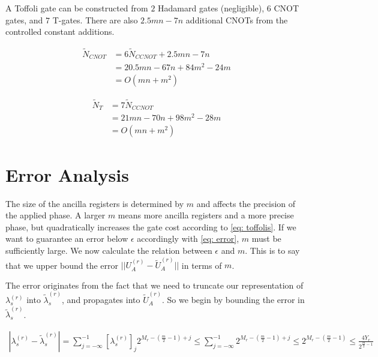 A Toffoli gate can be constructed from $2$ Hadamard gates (negligible), $6$ CNOT gates, and $7$ T-gates. There are also $2.5mn - 7n$ additional CNOTs from the controlled constant additions.

\begin{equation}
    \begin{split}
        \tilde{N}_{CNOT} &= 6\tilde{N}_{CCNOT} + 2.5mn - 7n \\
        &= 20.5mn - 67n + 84m^2 - 24m \\
        &= O(mn + m^2) \label{eq: cnots}
    \end{split}
\end{equation}

\begin{equation}
    \begin{split}
        \tilde{N}_{T} &= 7\tilde{N}_{CCNOT} \\
        &= 21mn - 70n + 98m^2 - 28m \\
        &= O(mn + m^2) \label{eq: Ts}
    \end{split}
\end{equation}

\section{Error Analysis}

The size of the ancilla registers is determined by $m$ and affects the precision of the applied phase. A larger $m$ means more ancilla registers and a more precise phase, but quadratically increases the gate cost according to \eqref{eq: toffolis}. If we want to guarantee an error below $\epsilon$ accordingly with \eqref{eq: error}, $m$ must be sufficiently large. We now calculate the relation between $\epsilon$ and $m$. This is to say that we upper bound the error $||U_A^{(r)} - \tilde{U}_A^{(r)}||$ in terms of $m$.

The error originates from the fact that we need to truncate our representation of $\lambda^{(r)}_s$ into $\tilde{\lambda}^{(r)}_s$, and propagates into $\tilde{U}_A^{(r)}$. So we begin by bounding the error in $\tilde{\lambda}^{(r)}_s$.

\begin{equation}
    \begin{split}
        |\lambda^{(r)}_s - \tilde{\lambda}^{(r)}_s| = \sum_{j = -\infty}^{-1} [\lambda^{(r)}_s]_j2^{M_r - (\frac{m}{2} - 1) + j} \leq \sum_{j = -\infty}^{-1} 2^{M_r - (\frac{m}{2} - 1) + j} \leq 2^{M_r - (\frac{m}{2} - 1)} \leq \frac{4Y_r}{2^{\frac{m}{2} - 1}}
    \end{split}
\end{equation}

